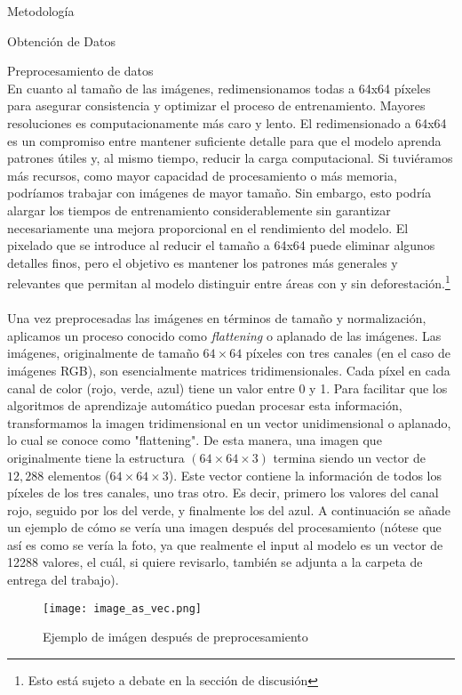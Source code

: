 \documentclass[11pt]{article}
\begin{document}
\begin{section}{Metodología}
\begin{subsection}{Obtención de Datos}
\begin{subsection}{Preprocesamiento de datos}
\\
En cuanto al tamaño de las imágenes, redimensionamos todas a 64x64 píxeles para asegurar consistencia y optimizar el proceso de entrenamiento. Mayores resoluciones es computacionamente más caro y lento. El redimensionado a 64x64 es un compromiso entre mantener suficiente detalle para que el modelo aprenda patrones útiles y, al mismo tiempo, reducir la carga computacional. Si tuviéramos más recursos, como mayor capacidad de procesamiento o más memoria, podríamos trabajar con imágenes de mayor tamaño. Sin embargo, esto podría alargar los tiempos de entrenamiento considerablemente sin garantizar necesariamente una mejora proporcional en el rendimiento del modelo. El pixelado que se introduce al reducir el tamaño a 64x64 puede eliminar algunos detalles finos, pero el objetivo es mantener los patrones más generales y relevantes que permitan al modelo distinguir entre áreas con y sin deforestación.\footnote{Esto está sujeto a debate en la sección de discusión}
\\
\\
Una vez preprocesadas las imágenes en términos de tamaño y normalización, aplicamos un proceso conocido como \textit{flattening} o aplanado de las imágenes. Las imágenes, originalmente de tamaño $64 \times 64$ píxeles con tres canales (en el caso de imágenes RGB), son esencialmente matrices tridimensionales. Cada píxel en cada canal de color (rojo, verde, azul) tiene un valor entre 0 y 1. Para facilitar que los algoritmos de aprendizaje automático puedan procesar esta información, transformamos la imagen tridimensional en un vector unidimensional o aplanado, lo cual se conoce como "flattening". De esta manera, una imagen que originalmente tiene la estructura $(64 \times 64 \times 3)$ termina siendo un vector de $12,288$ elementos ($64 \times 64 \times 3$). Este vector contiene la información de todos los píxeles de los tres canales, uno tras otro. Es decir, primero los valores del canal rojo, seguido por los del verde, y finalmente los del azul. A continuación se añade un ejemplo de cómo se vería una imagen después del procesamiento (nótese que así es como se vería la foto, ya que realmente el input al modelo es un vector de 12288 valores, el cuál, si quiere revisarlo, también se adjunta a la carpeta de entrega del trabajo). 

\begin{figure}[H]
    \centering
    \texttt{[image: image\_as\_vec.png]}
    \caption{Ejemplo de imágen después de preprocesamiento}
    \label{fig:imagename}
\end{figure}
\end{subsection}


\end{subsection}
\end{section}
\end{document}
